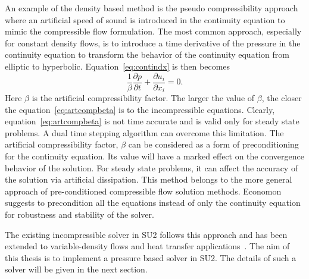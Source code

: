 
An example of the density based method is the pseudo compressibility approach~\cite{Park1984, Kwak2003, chorinartcomp} where  an artificial speed of sound is introduced in the continuity equation to mimic the compressible flow formulation.  The most common approach, especially for constant density flows, is to introduce a time derivative of the pressure in the continuity equation to transform the behavior of the continuity equation from elliptic to hyperbolic. Equation~\ref{eq:contindx} is then becomes
\begin{equation}
\frac{1}{\beta}\frac{\partial p}{\partial t} + \frac{\partial u_i}{\partial x_i} = 0.
\label{eq:artcompbeta}
\end{equation}
Here $\beta$ is the artificial compressibility factor. The larger the value of $\beta$, the closer the equation~\ref{eq:artcompbeta} is to the incompressible equations. Clearly, equation~\ref{eq:artcompbeta} is not time accurate and is valid only for steady state problems. A dual time stepping algorithm can overcome this limitation. The artificial compressibility factor, $\beta$ can be considered as a form of preconditioning for the continuity equation. Its value will have a marked effect on the convergence behavior of the solution. For steady state problems, it can affect the accuracy of the solution via artificial dissipation. This method belongs to the more general approach of pre-conditioned compressible flow solution methods. Economon~\cite{Tom2019} suggests to precondition all the equations instead of only the continuity equation for robustness and stability of the solver.

The existing incompressible solver in SU2 follows this approach and has been extended to variable-density flows and heat transfer applications~\cite{Tom2019}. The aim of this thesis is to implement a pressure based solver in SU2. The details of such a solver will be given in the next section.

